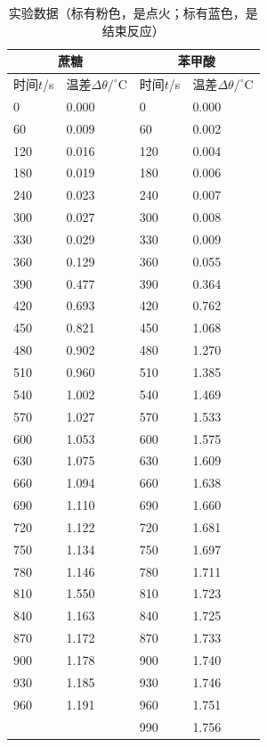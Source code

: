\documentclass[UTF8,AutoFakeBold,a4paper]{article}
\begin{document}
\newpage
\begin{table}[h]
		\centering
		\begin{tabular}{p{3cm}<{\centering} p{3cm}<{\centering} p{3cm}<{\centering} p{3cm}<{\centering}}
		\toprule
		\multicolumn{2}{c}{蔗糖} &   \multicolumn{2}{c}{苯甲酸}   \\  
		\midrule
        时间$t$/s & 温差$\Delta\theta/^{\circ}$C & 时间$t$/s & 温差$\Delta\theta/^{\circ}$C \\  
        \midrule
        0 & 0.000 & 0 & 0.000 \\  
        60 & 0.009 & 60 & 0.002 \\  
        120 & 0.016 & 120 & 0.004 \\  
        180 & 0.019 & 180 & 0.006 \\  
        240 & 0.023 & 240 & 0.007 \\  
        300 & 0.027 & 300 & 0.008 \\  
        330 & 0.029 & 330 & 0.009 \\ 
        \rowcolor{mypink} 
        360 & 0.129 & 360 & 0.055 \\  
        390 & 0.477 & 390 & 0.364 \\  
        420 & 0.693 & 420 & 0.762 \\  
        450 & 0.821 & 450 & 1.068 \\  
        480 & 0.902 & 480 & 1.270 \\  
        510 & 0.960 & 510 & 1.385 \\  
        540 & 1.002 & 540 & 1.469 \\  
        570 & 1.027 & 570 & 1.533 \\  
        600 & 1.053 & 600 & 1.575 \\  
        630 & 1.075 & 630 & 1.609 \\  
        660 & 1.094 & 660 & 1.638 \\  
        690 & 1.110 & 690 & 1.660 \\  
        720 & 1.122 & 720 & 1.681 \\  
        750 & 1.134 & 750 & 1.697 \\  
        780 & 1.146 & 780 & 1.711 \\  
        810 & 1.550 & 810 & 1.723 \\
        \rowcolor{mycyan}  
        840 & 1.163 & 840 & 1.725 \\  
        870 & 1.172 & 870 & 1.733 \\  
        900 & 1.178 & 900 & 1.740 \\  
        930 & 1.185 & 930 & 1.746 \\  
        960 & 1.191 & 960 & 1.751 \\  
         & &990 & 1.756   \\  
		\bottomrule
		\end{tabular}	
		\label{ta1}
		\caption{实验数据（标有\textcolor{mypink}{粉色}，是点火；标有\textcolor{mycyan}{蓝色}，是结束反应）}
\end{table}
\newpage
\end{document}
